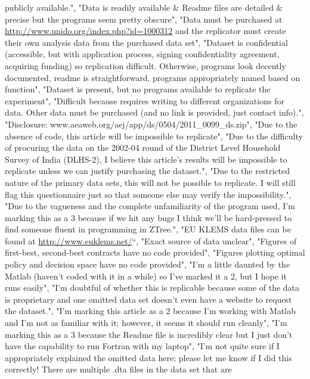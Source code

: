 \documentclass[]{article}
\begin{document}
\begin{itemize}
  publicly available.", "Data is readily available \& Readme files are
  detailed \& precise but the programs seem pretty obscure", "Data must
  be purchased at \url{http://www.unido.org/index.php?id=1000312} and
  the replicator must create their own analysis data from the purchased
  data set", "Dataset is confidential (accessible, but with application
  process, signing confidentiality agreement, acquiring funding) so
  replication difficult. Otherwise, programs look decently documented,
  readme is straightforward, programs appropriately named based on
  function", "Dataset is present, but no programs available to replicate
  the experiment", "Difficult because requires writing to different
  organizations for data. Other data must be purchased (and no link is
  provided, just contact info).", "Disclosure:
  www.aeaweb.org/aej/app/ds/0504/2011\_0099\_ds.zip", "Due to the
  absence of code, this article will be impossible to replicate", "Due
  to the difficulty of procuring the data on the 2002-04 round of the
  District Level Household Survey of India (DLHS-2), I believe this
  article's results will be impossible to replicate unless we can
  justify purchasing the dataset.", "Due to the restricted nature of the
  primary data sets, this will not be possible to replicate. I will
  still flag this questionnaire just so that someone else may verify the
  impossibility.", "Due to the vagueness and the complete unfamiliarity
  of the program used, I'm marking this as a 3 because if we hit any
  bugs I think we'll be hard-pressed to find someone fluent in
  programming in ZTree.", "EU KLEMS data files can be found at
  \url{http://www.euklems.net/}``, "Exact source of data unclear",
  "Figures of first-best, second-best contracts have no code provided",
  "Figures plotting optimal policy and decision space have no code
  provided", "I'm a little daunted by the Matlab (haven't coded with it
  in a while) so I've marked it a 2, but I hope it runs easily", "I'm
  doubtful of whether this is replicable because some of the data is
  proprietary and one omitted data set doesn't even have a website to
  request the dataset.", "I'm marking this article as a 2 because I'm
  working with Matlab and I'm not as familiar with it; however, it seems
  it should run cleanly", "I'm marking this as a 3 because the Readme
  file is incredibly clear but I just don't have the capability to run
  Fortran with my laptop", "I'm not quite sure if I appropriately
  explained the omitted data here; please let me know if I did this
  correctly! There are multiple .dta files in the data set that are

\end{itemize}
\end{document}
